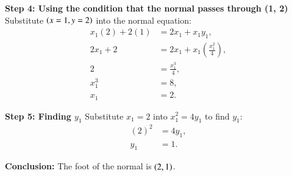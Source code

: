 \documentclass[journal]{IEEEtran}
\begin{document}
\textbf{Step 4: Using the condition that the normal passes through (1, 2)}  
Substitute $\left(x = 1, y = 2\right)$ into the normal equation:
\begin{align}
    x_1(2) + 2(1) &= 2x_1 + x_1y_1, \\
    2x_1 + 2 &= 2x_1 + x_1\left(\frac{x_1^2}{4}\right), \\
    2 &= \frac{x_1^3}{4}, \\
    x_1^3 &= 8, \\
    x_1 &= 2.
\end{align}

\textbf{Step 5: Finding $y_1$}  
Substitute $x_1 = 2$ into $x_1^2 = 4y_1$ to find $y_1$:
\begin{align}
    (2)^2 &= 4y_1, \\
    y_1 &= 1.
\end{align}

\textbf{Conclusion:}  
The foot of the normal is $\left(2, 1\right)$.
\end{document}
